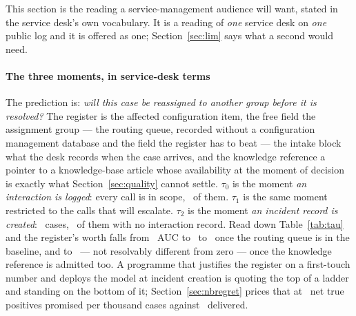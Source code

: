 This section is the reading a service-management audience will want, stated
in the service desk's own vocabulary. It is a reading of \emph{one} service desk on
\emph{one} public log and it is offered as one; Section~\ref{sec:lim} says
what a second would need.

\paragraph{The three moments, in service-desk terms}
The prediction is: \emph{will this case be reassigned to another group before
it is resolved?} The register is the affected configuration item, the free
field the assignment group --- the routing queue, recorded without a
configuration management database and the field the register has to beat ---
the intake block what the desk records when the case arrives, and the
knowledge reference a pointer to a knowledge-base article whose availability
at the moment of decision is exactly what Section~\ref{sec:quality} cannot
settle. $\tau_0$ is the moment \emph{an interaction is logged}: every call is in scope,
\nTauZero\ of them. $\tau_1$ is the same moment restricted to the calls that
will escalate. $\tau_2$ is the moment \emph{an incident record is created}: \nTauTwo\
cases, \nTauTwoUnmatched\ of them with no interaction record. Read down
Table~\ref{tab:tau} and the register's worth falls from \VtauZero\ AUC to
\VtauOne\ to \VTtwoGroup\ once the routing queue is in the baseline, and to
\VTtwoKnow\ --- not resolvably different from zero --- once the knowledge
reference is admitted too. A programme that justifies the register on a
first-touch number and deploys the model at incident creation is quoting the
top of a ladder and standing on the bottom of it;
Section~\ref{sec:nbregret} prices that at \promisedPerThousand\ net true
positives promised per thousand cases against \deliveredPerThousand\
delivered.

